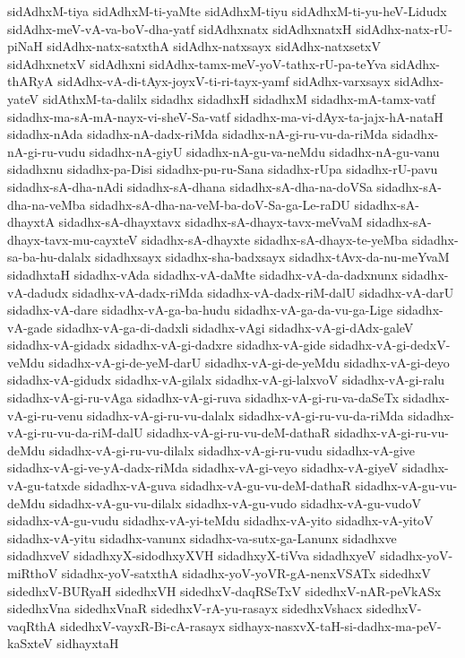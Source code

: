 {sidAdhxM-tiya
sidAdhxM-ti-yaMte
sidAdhxM-tiyu
sidAdhxM-ti-yu-heV-Lidudx
sidAdhx-meV-vA-va-boV-dha-yatf
sidAdhxnatx
sidAdhxnatxH
sidAdhx-natx-rU-piNaH
sidAdhx-natx-satxthA
sidAdhx-natxsayx
sidAdhx-natxsetxV
sidAdhxnetxV
sidAdhxni
sidAdhx-tamx-meV-yoV-tathx-rU-pa-teYva
sidAdhx-thARyA
sidAdhx-vA-di-tAyx-joyxV-ti-ri-tayx-yamf
sidAdhx-varxsayx
sidAdhx-yateV
sidAthxM-ta-dalilx
sidadhx
sidadhxH
sidadhxM
sidadhx-mA-tamx-vatf
sidadhx-ma-sA-mA-nayx-vi-sheV-Sa-vatf
sidadhx-ma-vi-dAyx-ta-jajx-hA-nataH
sidadhx-nAda
sidadhx-nA-dadx-riMda
sidadhx-nA-gi-ru-vu-da-riMda
sidadhx-nA-gi-ru-vudu
sidadhx-nA-giyU
sidadhx-nA-gu-va-neMdu
sidadhx-nA-gu-vanu
sidadhxnu
sidadhx-pa-Disi
sidadhx-pu-ru-Sana
sidadhx-rUpa
sidadhx-rU-pavu
sidadhx-sA-dha-nAdi
sidadhx-sA-dhana
sidadhx-sA-dha-na-doVSa
sidadhx-sA-dha-na-veMba
sidadhx-sA-dha-na-veM-ba-doV-Sa-ga-Le-raDU
sidadhx-sA-dhayxtA
sidadhx-sA-dhayxtavx
sidadhx-sA-dhayx-tavx-meVvaM
sidadhx-sA-dhayx-tavx-mu-cayxteV
sidadhx-sA-dhayxte
sidadhx-sA-dhayx-te-yeMba
sidadhx-sa-ba-hu-dalalx
sidadhxsayx
sidadhx-sha-badxsayx
sidadhx-tAvx-da-nu-meYvaM
sidadhxtaH
sidadhx-vAda
sidadhx-vA-daMte
sidadhx-vA-da-dadxnunx
sidadhx-vA-dadudx
sidadhx-vA-dadx-riMda
sidadhx-vA-dadx-riM-dalU
sidadhx-vA-darU
sidadhx-vA-dare
sidadhx-vA-ga-ba-hudu
sidadhx-vA-ga-da-vu-ga-Lige
sidadhx-vA-gade
sidadhx-vA-ga-di-dadxli
sidadhx-vAgi
sidadhx-vA-gi-dAdx-galeV
sidadhx-vA-gidadx
sidadhx-vA-gi-dadxre
sidadhx-vA-gide
sidadhx-vA-gi-dedxV-veMdu
sidadhx-vA-gi-de-yeM-darU
sidadhx-vA-gi-de-yeMdu
sidadhx-vA-gi-deyo
sidadhx-vA-gidudx
sidadhx-vA-gilalx
sidadhx-vA-gi-lalxvoV
sidadhx-vA-gi-ralu
sidadhx-vA-gi-ru-vAga
sidadhx-vA-gi-ruva
sidadhx-vA-gi-ru-va-daSeTx
sidadhx-vA-gi-ru-venu
sidadhx-vA-gi-ru-vu-dalalx
sidadhx-vA-gi-ru-vu-da-riMda
sidadhx-vA-gi-ru-vu-da-riM-dalU
sidadhx-vA-gi-ru-vu-deM-dathaR
sidadhx-vA-gi-ru-vu-deMdu
sidadhx-vA-gi-ru-vu-dilalx
sidadhx-vA-gi-ru-vudu
sidadhx-vA-give
sidadhx-vA-gi-ve-yA-dadx-riMda
sidadhx-vA-gi-veyo
sidadhx-vA-giyeV
sidadhx-vA-gu-tatxde
sidadhx-vA-guva
sidadhx-vA-gu-vu-deM-dathaR
sidadhx-vA-gu-vu-deMdu
sidadhx-vA-gu-vu-dilalx
sidadhx-vA-gu-vudo
sidadhx-vA-gu-vudoV
sidadhx-vA-gu-vudu
sidadhx-vA-yi-teMdu
sidadhx-vA-yito
sidadhx-vA-yitoV
sidadhx-vA-yitu
sidadhx-vanunx
sidadhx-va-sutx-ga-Lanunx
sidadhxve
sidadhxveV
sidadhxyX-sidodhxyXVH
sidadhxyX-tiVva
sidadhxyeV
sidadhx-yoV-miRthoV
sidadhx-yoV-satxthA
sidadhx-yoV-yoVR-gA-nenxVSATx
sidedhxV
sidedhxV-BURyaH
sidedhxVH
sidedhxV-daqRSeTxV
sidedhxV-nAR-peVkASx
sidedhxVna
sidedhxVnaR
sidedhxV-rA-yu-rasayx
sidedhxVshacx
sidedhxV-vaqRthA
sidedhxV-vayxR-Bi-cA-rasayx
sidhayx-nasxvX-taH-si-dadhx-ma-peV-kaSxteV
sidhayxtaH
}
